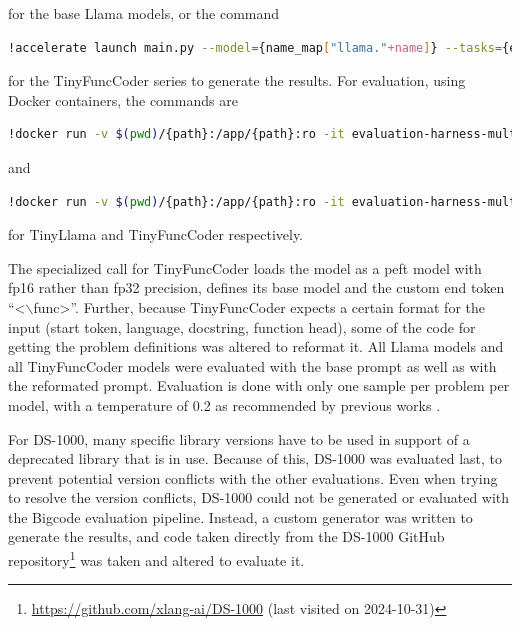 for the base Llama models, or the command

\begin{lstlisting}[language=bash]
    !accelerate launch main.py --model={name_map["llama."+name]} --tasks={eval_type} --save_generations --save_generations_path=save/{name}/{reformatted_path} --peft_model={name_map[name]} --eos="</func>" --n_samples=1 --trust_remote_code --prompt=continue --temperature=0.2 --precision=fp16 --generation_only
\end{lstlisting}

for the TinyFuncCoder series to generate the results.
For evaluation, using Docker containers, the commands are

\begin{lstlisting}[language=bash]
    !docker run -v $(pwd)/{path}:/app/{path}:ro -it evaluation-harness-multiple --model={name_map[name]} --tasks={eval_type} --load_generations_path=/app/{path} --n_samples=1 --allow_code_execution --trust_remote_code --temperature=0.2 --prompt=continue
\end{lstlisting}

and

\begin{lstlisting}[language=bash]
    !docker run -v $(pwd)/{path}:/app/{path}:ro -it evaluation-harness-multiple --model={name_map[name]} --tasks={eval_type} --load_generations_path={path} --n_samples=1 --allow_code_execution --trust_remote_code --temperature=0.2 --peft_model={name_map[name]} --eos="</func>" --precision=fp16 --prompt=continue
\end{lstlisting}

for TinyLlama and TinyFuncCoder respectively.

The specialized call for TinyFuncCoder loads the model as a \ac{peft} model with fp16 rather than fp32 precision, defines its base model and the custom end token \enquote{<$\backslash$func>}.
Further, because TinyFuncCoder expects a certain format for the input (start token, language, docstring, function head), some of the code for getting the problem definitions was altered to reformat it.
All Llama models and all TinyFuncCoder models were evaluated with the base prompt as well as with the reformated prompt.
Evaluation is done with only one sample per problem per model, with a temperature of 0.2 as recommended by previous works \cite{Chen.2021,Luo.2024,Wei.2024}.

For DS-1000, many specific library versions have to be used in support of a deprecated library that is in use.
Because of this, DS-1000 was evaluated last, to prevent potential version conflicts with the other evaluations.
Even when trying to resolve the version conflicts, DS-1000 could not be generated or evaluated with the Bigcode evaluation pipeline.
Instead, a custom generator was written to generate the results, and code taken directly from the DS-1000 GitHub repository\footnote{\url{https://github.com/xlang-ai/DS-1000} (last visited on 2024-10-31)} was taken and altered to evaluate it.

